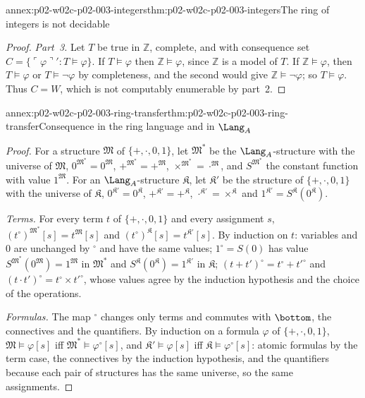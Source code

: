 \begin{annexitem}{annex:p02-w02c-p02-003-integers}{thm:p02-w02c-p02-003-integers}{The ring of integers is not decidable}
\begin{proof}
\emph{Part~3.}  Let \(T\) be true in \(\mathbb Z\), complete, and with
consequence set \(C=\{\ulcorner\varphi\urcorner':T\models\varphi\}\).  If
\(T\models\varphi\) then \(\mathbb Z\models\varphi\), since \(\mathbb Z\)
is a model of \(T\).  If \(\mathbb Z\models\varphi\), then
\(T\models\varphi\) or \(T\models\neg\varphi\) by completeness, and the
second would give \(\mathbb Z\models\neg\varphi\); so \(T\models\varphi\).
Thus \(C=W\), which is not computably enumerable by part~2.
\end{proof}
\end{annexitem}

\begin{annexitem}{annex:p02-w02c-p02-003-ring-transfer}{thm:p02-w02c-p02-003-ring-transfer}{Consequence in the ring language and in \(\Lang_A\)}
\begin{proof}
For a structure \(\mathfrak M\) of \(\{+,\cdot,0,1\}\), let
\(\mathfrak M^{*}\) be the \(\Lang_A\)-structure with the universe of
\(\mathfrak M\), \(0^{\mathfrak M^{*}}=0^{\mathfrak M}\),
\(+^{\mathfrak M^{*}}=+^{\mathfrak M}\),
\(\times^{\mathfrak M^{*}}=\cdot^{\mathfrak M}\), and \(S^{\mathfrak M^{*}}\)
the constant function with value \(1^{\mathfrak M}\).  For an
\(\Lang_A\)-structure \(\mathfrak K\), let \(\mathfrak K'\) be the structure
of \(\{+,\cdot,0,1\}\) with the universe of \(\mathfrak K\),
\(0^{\mathfrak K'}=0^{\mathfrak K}\), \(+^{\mathfrak K'}=+^{\mathfrak K}\),
\(\cdot^{\mathfrak K'}=\times^{\mathfrak K}\) and
\(1^{\mathfrak K'}=S^{\mathfrak K}(0^{\mathfrak K})\).

\emph{Terms.}  For every term \(t\) of \(\{+,\cdot,0,1\}\) and every
assignment \(s\),
\((t^{\circ})^{\mathfrak M^{*}}[s]=t^{\mathfrak M}[s]\) and
\((t^{\circ})^{\mathfrak K}[s]=t^{\mathfrak K'}[s]\).  By induction on
\(t\): variables and \(0\) are unchanged by \({}^{\circ}\) and have the
same values; \(1^{\circ}=S(0)\) has value
\(S^{\mathfrak M^{*}}(0^{\mathfrak M})=1^{\mathfrak M}\) in
\(\mathfrak M^{*}\) and \(S^{\mathfrak K}(0^{\mathfrak K})=1^{\mathfrak K'}\)
in \(\mathfrak K\); \((t+t')^{\circ}=t^{\circ}+t'^{\circ}\) and
\((t\cdot t')^{\circ}=t^{\circ}\times t'^{\circ}\), whose values agree by
the induction hypothesis and the choice of the operations.

\emph{Formulas.}  The map \({}^{\circ}\) changes only terms and commutes
with \(\bottom\), the connectives and the quantifiers.  By induction on a
formula \(\varphi\) of \(\{+,\cdot,0,1\}\),
\(\mathfrak M\models\varphi[s]\) iff \(\mathfrak M^{*}\models\varphi^{\circ}[s]\),
and \(\mathfrak K'\models\varphi[s]\) iff
\(\mathfrak K\models\varphi^{\circ}[s]\): atomic formulas by the term case,
the connectives by the induction hypothesis, and the quantifiers because
each pair of structures has the same universe, so the same assignments.


\end{proof}
\end{annexitem}
